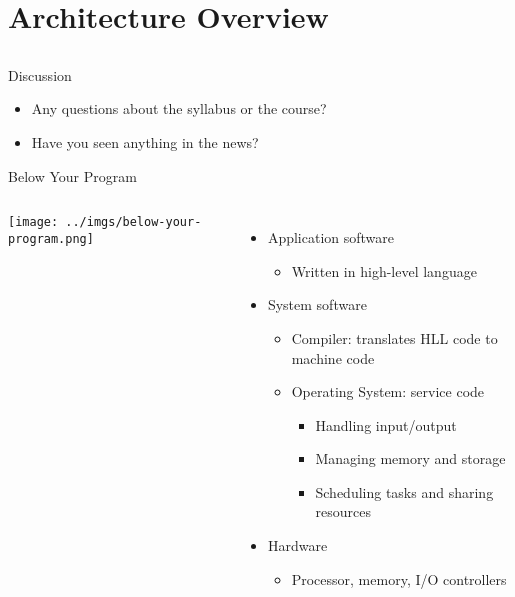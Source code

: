 \documentclass{beamer}
\begin{document}
\section{Architecture Overview}
\subsection{}

\begin{frame}{Discussion}
\begin{itemize}
\item Any questions about the syllabus or the course?
\item Have you seen anything in the news?
\end{itemize}
\end{frame}

\begin{frame}{Below Your Program}
\begin{columns}
\texttt{[image: ../imgs/below-your-program.png]}
\begin{itemize}
\item Application software
\begin{itemize}
\item Written in high-level language
\end{itemize}
\item System software
\begin{itemize}
\item Compiler: translates HLL code to machine code
\item Operating System: service code
\begin{itemize}
\item Handling input/output
\item Managing memory and storage
\item Scheduling tasks and sharing resources
\end{itemize}
\end{itemize}
\item Hardware
\begin{itemize}
\item Processor, memory, I/O controllers
\end{itemize}
\end{itemize}
\end{columns}
\end{frame}
\end{document}
